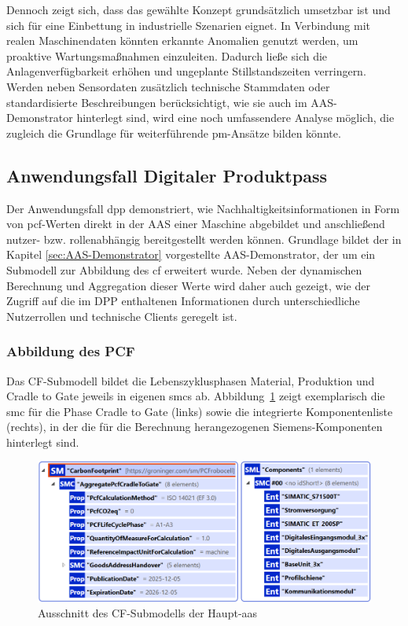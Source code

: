 Dennoch zeigt sich, dass das gewählte Konzept grundsätzlich umsetzbar ist und sich für eine Einbettung in industrielle Szenarien eignet. 
In Verbindung mit realen Maschinendaten könnten erkannte Anomalien genutzt werden, um proaktive Wartungsmaßnahmen einzuleiten. 
Dadurch ließe sich die Anlagenverfügbarkeit erhöhen und ungeplante Stillstandszeiten verringern.
Werden neben Sensordaten zusätzlich technische Stammdaten oder standardisierte Beschreibungen berücksichtigt, wie sie auch im AAS-Demonstrator hinterlegt sind, wird eine noch umfassendere Analyse möglich, die zugleich die Grundlage für weiterführende \acs{pm}-Ansätze bilden könnte.

\newpage
\subsection{Anwendungsfall Digitaler Produktpass}
Der Anwendungsfall \acs{dpp} demonstriert, wie Nachhaltigkeitsinformationen in Form von \acs{pcf}-Werten direkt in der AAS einer Maschine abgebildet und anschließend nutzer- bzw. rollenabhängig bereitgestellt werden können. 
Grundlage bildet der in Kapitel \ref{sec:AAS-Demonstrator} vorgestellte AAS-Demonstrator, der um ein Submodell zur Abbildung des \acs{cf} erweitert wurde. 
Neben der dynamischen Berechnung und Aggregation dieser Werte wird daher auch gezeigt, wie der Zugriff auf die im DPP enthaltenen Informationen durch unterschiedliche Nutzerrollen und technische Clients geregelt ist.

\subsubsection{Abbildung des PCF}
Das CF-Submodell bildet die Lebenszyklusphasen Material, Produktion und Cradle to Gate jeweils in eigenen \acsp{smc} ab.
Abbildung~\ref{fig:SubmodellCF} zeigt exemplarisch die \acs{smc} für die Phase Cradle to Gate (links) sowie die integrierte Komponentenliste (rechts), in der die für die Berechnung herangezogenen Siemens-Komponenten hinterlegt sind.

\begin{figure}[htbp]
    \centering
        \includegraphics[width=1\textwidth]{Bilder/ErgebnissePackageExplorer/CarbonFoorprintTest.png}
    \caption{Ausschnitt des CF-Submodells der Haupt-\acs{aas}}
    \label{fig:SubmodellCF}
\end{figure}

